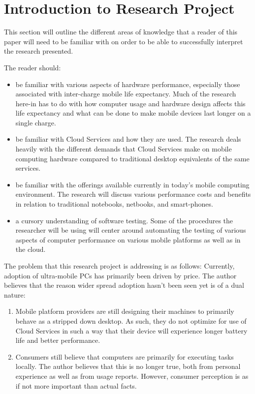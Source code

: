 \section{Introduction to Research Project}

This section will outline the different areas of knowledge that a reader of this
paper will need to be familiar with on order to be able to successfully
interpret the research presented.

The reader should:

\begin{itemize}

\item be familiar with various aspects of hardware performance, especially those
  associated with inter-charge mobile life expectancy.  Much of the research
  here-in has to do with how computer usage and hardware design affects this
  life expectancy and what can be done to make mobile devices last longer on a
  single charge.

\item be familiar with Cloud Services and how they are used.  The research deals
  heavily with the different demands that Cloud Services make on mobile
  computing hardware compared to traditional desktop equivalents of the same
  services.

\item be familiar with the offerings available currently in today's mobile
  computing environment.  The research will discuss various performance costs
  and benefits in relation to traditional notebooks, netbooks, and smart-phones.

\item a cursory understanding of software testing.  Some of the procedures the
  researcher will be using will center around automating the testing of various
  aspects of computer performance on various mobile platforms as well as in the
  cloud.

\end{itemize}

The problem that this research project is addressing is as follows: Currently,
adoption of ultra-mobile PCs has primarily been driven by price.  The author
believes that the reason wider spread adoption hasn't been seen yet is of a dual
nature:

\begin{enumerate}

\item Mobile platform providers are still designing their machines to primarily
  behave as a stripped down desktop.  As such, they do not optimize for use of
  Cloud Services in such a way that their device will experience longer battery
  life and better performance.

\item Consumers still believe that computers are primarily for executing tasks
  locally.  The author believes that this is no longer true, both from personal
  experience as well as from usage reports.  However, consumer perception is as
  if not more important than actual facts.

\end{enumerate}

